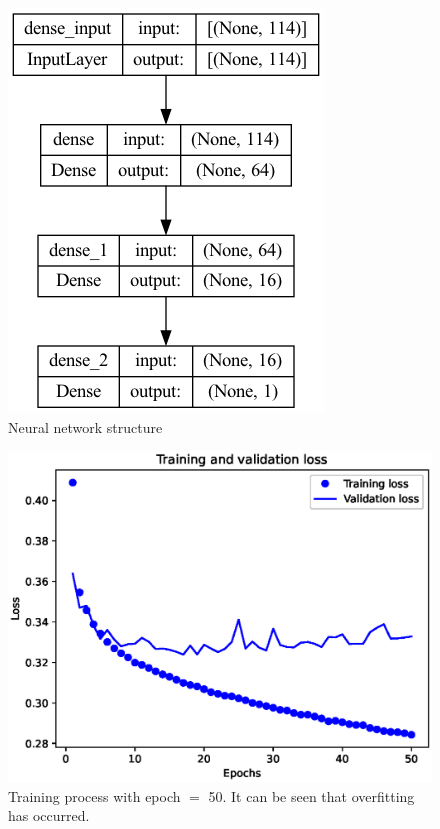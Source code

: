 \documentclass[11pt, a4paper, jou]{apa7}
\begin{document}
\begin{table}[h]
    \centering
    \caption{Classification results of SVM with gaussian kernel function and using PCA on the test set. }
    \label{tab:SVM_gauss_PCA_summary}
\end{table}

\begin{figure}[h]
    \centering
    \caption{Neural network structure}\label{fig:NN}
    \includegraphics[width=.3\textwidth]{figures/Network_structure.png}
\end{figure}

\begin{figure}[h]
    \centering
    \caption{Training process with epoch $=$ 50. It can be seen that overfitting has occurred. }\label{fig:NN_process_50}
    \includegraphics[width=.45\textwidth]{figures/error_50.eps}
\end{figure}
\end{document}
